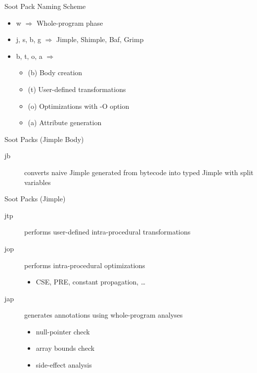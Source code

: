 

\begin{slide}{Soot Pack Naming Scheme}
\begin{itemize}
\item w $\Rightarrow$ Whole-program phase
\item j, s, b, g $\Rightarrow$ Jimple, Shimple, Baf, Grimp
\item b, t, o, a $\Rightarrow$
\begin{itemize}
\item (b) Body creation
\item (t) User-defined transformations
\item (o) Optimizations with -O option
\item (a) Attribute generation
\end{itemize}
\end{itemize}
\end{slide}


\begin{slide}{Soot Packs (Jimple Body)}
\begin{description}
\item[jb] converts naive Jimple generated from bytecode into
typed Jimple with split variables
\end{description}
\end{slide}

\begin{slide}{Soot Packs (Jimple)}
\begin{description}
\item[jtp] performs user-defined intra-procedural transformations
\item[jop] performs intra-procedural optimizations
\begin{itemize}
\item CSE, PRE, constant propagation, \ldots
\end{itemize}
\item[jap] generates annotations using whole-program analyses
\begin{itemize}
\item null-pointer check
\item array bounds check
\item side-effect analysis
\end{itemize}
\end{description}
\end{slide}

